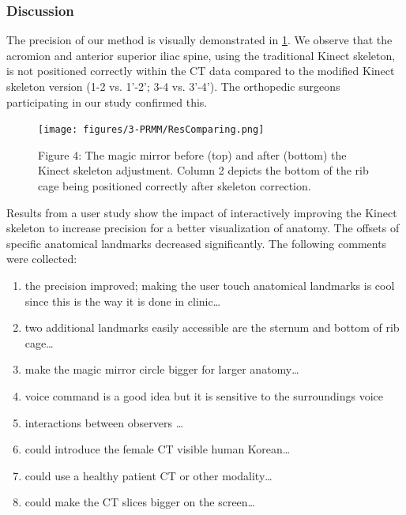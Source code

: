 \subsubsection{Discussion}
The precision of our method is visually demonstrated in \figurename{\ref{fig:3-PRMM:ResComparing}}. We observe that the acromion and anterior superior iliac spine, using the traditional Kinect skeleton, is not positioned correctly within the CT data compared to the modified Kinect skeleton version (1-2 vs. 1'-2'; 3-4 vs. 3'-4'). The orthopedic surgeons participating in our study confirmed this.
\begin{figure}[htb]
	\centering
	\texttt{[image: figures/3-PRMM/ResComparing.png]}
	\label{fig:3-PRMM:ResComparing}
	\caption{Figure 4:	The magic mirror before (top) and after (bottom) the Kinect skeleton adjustment. Column 2 depicts the bottom of the rib cage being positioned correctly after skeleton correction.}
\end{figure}
Results from a user study show the impact of interactively improving the Kinect skeleton to increase precision for a better visualization of anatomy. The offsets of specific anatomical landmarks decreased significantly. The following comments were collected:
\begin{enumerate}
	\item the precision improved; making the user touch anatomical landmarks is cool since this is the way it is done in clinic…
	\item two additional landmarks easily accessible are the sternum and bottom of rib cage…
	\item make the magic mirror circle bigger for larger anatomy…
	\item voice command is a good idea but it is sensitive to the surroundings voice
	\item interactions between observers …
	\item could introduce the female CT visible human Korean…
	\item could use a healthy patient CT or other modality…
	\item could make the CT slices bigger on the screen…
\end{enumerate}